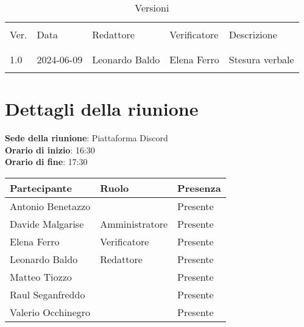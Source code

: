 \documentclass[italian,12pt]{article}
\begin{document}


\newpage



\begin{table}[!h]
	\caption{Versioni}
	\footnotesize
	\begin{center}
		\begin{tabular}{ l l l l l }
			\hline                                                             \\[-2ex]
			Ver. & Data       & Redattore   & Verificatore   & Descrizione     \\
			\\[-2ex] \hline \\[-1.5ex]
			1.0  & 2024-06-09 & Leonardo Baldo & Elena Ferro & Stesura verbale \\
			\\[-1.5ex] \hline
		\end{tabular}
	\end{center}
\end{table}

\newpage

\tableofcontents

\newpage

\section{Dettagli della riunione}


\textbf{Sede della riunione}: Piattaforma Discord\\
\textbf{Orario di inizio}: 16:30\\
\textbf{Orario di fine}: 17:30\\


\begin{flushleft}
	\begin{table}[!h]
		\begin{tabular}{ |l|l|l| }
			\hline
			\textbf{Partecipante} & \textbf{Ruolo} & \textbf{Presenza} \\
			\hline
			Antonio Benetazzo     &                & Presente          \\
			Davide Malgarise      & Amministratore & Presente          \\
			Elena Ferro           & Verificatore   & Presente          \\
			Leonardo Baldo        & Redattore      & Presente          \\
			Matteo Tiozzo         &                & Presente          \\
			Raul Seganfreddo      &                & Presente          \\
			Valerio Occhinegro    &                & Presente          \\
			\hline
		\end{tabular}
	\end{table}
\end{flushleft}
\end{document}
